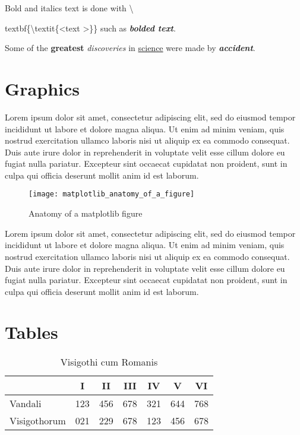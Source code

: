 \documentclass[10pt, letterpaper, twoside]{article}
\begin{document}
Bold and italics text is done with \textbackslash{textbf\{\textbackslash{textit\{\textless text \textgreater\}\}} such as \textbf{\textit{bolded text}}.

Some of the \textbf{greatest} \textit{discoveries} in \underline{science} were made by \textbf{\textit{accident}}.

\newpage
\section{Graphics}
\label{sec:graphics}
Lorem ipsum dolor sit amet, consectetur adipiscing elit, sed do eiusmod tempor incididunt ut labore et dolore magna aliqua. Ut enim ad minim veniam, quis nostrud exercitation ullamco laboris nisi ut aliquip ex ea commodo consequat. Duis aute irure dolor in reprehenderit in voluptate velit esse cillum dolore eu fugiat nulla pariatur. Excepteur sint occaecat cupidatat non proident, sunt in culpa qui officia deserunt mollit anim id est laborum.

\begin{figure}[H]
\label{fig:anatomy_of_a_matplotlib_figure}
\texttt{[image: matplotlib\_anatomy\_of\_a\_figure]}
\caption{Anatomy of a matplotlib figure}
\end{figure}

Lorem ipsum dolor sit amet, consectetur adipiscing elit, sed do eiusmod tempor incididunt ut labore et dolore magna aliqua. Ut enim ad minim veniam, quis nostrud exercitation ullamco laboris nisi ut aliquip ex ea commodo consequat. Duis aute irure dolor in reprehenderit in voluptate velit esse cillum dolore eu fugiat nulla pariatur. Excepteur sint occaecat cupidatat non proident, sunt in culpa qui officia deserunt mollit anim id est laborum.

\newpage
\section{Tables}
\label{sec:tables}

\begin{table}[H]
\begin{flushleft}
\begin{tabular}{lcccccc}
\toprule
& I &  II & III & IV & V & VI \\
\midrule
Vandali     & 123 & 456 & 678 & 321 & 644 & 768  \\
Visigothorum & 021 & 229 & 678 & 123 & 456 & 678 \\
\bottomrule
\end{tabular}
\label{tab:visigothi_cum_romanis}
\caption{Visigothi cum Romanis}
\end{flushleft}
\end{table}

}
\end{document}
